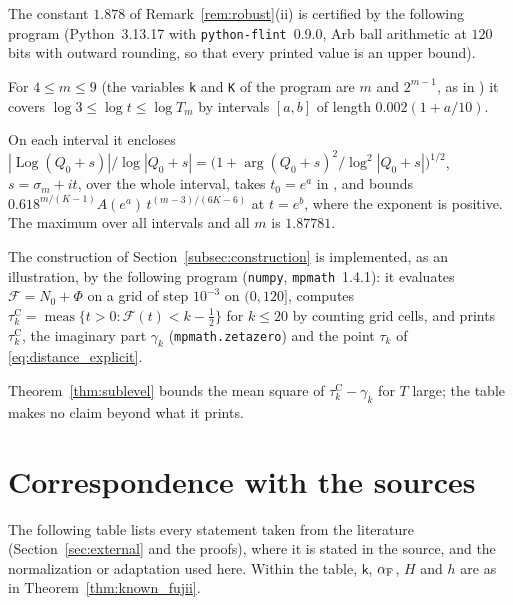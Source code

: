 \documentclass[11pt,a4paper]{article}
\makeatletter
\numberwithin{equation}{section}
\DeclareRobustCommand{\CGref}[1]{\ref{#1}}
\DeclareRobustCommand{\CGeqref}[1]{\eqref{#1}}
\DeclareRobustCommand{\CGcite}[2][]{\if\relax\detokenize{#1}\relax\cite{#2}\else\cite[#1]{#2}\fi}
\let\CG@origref\ref
\let\CG@origeqref\eqref
\newcommand{\CG@gettip}[1]{\@ifundefined{CGTip@#1}{#1}{\csname CGTip@#1\endcsname}}
\newcommand{\CG@getbib}[1]{\@ifundefined{CGBib@#1}{#1}{\csname CGBib@#1\endcsname}}
\DeclareRobustCommand{\CGref}[1]{\pdftooltip{\CG@origref{#1}}{\CG@gettip{#1}}}
\DeclareRobustCommand{\CGeqref}[1]{\pdftooltip{\CG@origeqref{#1}}{\CG@gettip{#1}}}
\DeclareRobustCommand{\CGcite}[2][]{\pdftooltip{\if\relax\detokenize{#1}\relax\cite{#2}\else\cite[#1]{#2}\fi}{\CG@getbib{#2}}}
\theoremstyle{definition}
\theoremstyle{remark}
\newcommand{\Nz}{N_0} %
\newcommand{\Fc}{\mathcal F}
\newcommand{\Ph}{\Phi}
\newcommand{\meas}{\operatorname{meas}}
\makeatother
\begin{document}




The constant $1.878$ of Remark~\CGref{rem:robust}(ii) is certified by the following program (Python~3.13.17 with \texttt{python-flint}~0.9.0, Arb ball arithmetic at $120$ bits with outward rounding, so that every printed value is an upper bound).

For $4\le m\le9$ (the variables \texttt{k} and \texttt{K} of the program are $m$ and $2^{m-1}$, as in \CGcite[\S3]{Yang2024}) it covers $\log3\le\log t\le\log T_m$ by intervals $[a,b]$ of length $0.002(1+a/10)$.

On each interval it encloses $|\operatorname{Log}(Q_0+s)|/\log|Q_0+s|=\bigl(1+\arg(Q_0+s)^2/\log^2|Q_0+s|\bigr)^{1/2}$, $s=\sigma_m+it$, over the whole interval, takes $t_0=e^a$ in \CGcite[(3.12)]{Yang2024}, and bounds $0.618^{m/(K-1)}A(e^a)\,t^{(m-3)/(6K-6)}$ at $t=e^b$, where the exponent is positive. The maximum over all intervals and all $m$ is $1.87781$.





The construction of Section~\CGref{subsec:construction} is implemented, as an illustration, by the following program (\texttt{numpy}, \texttt{mpmath}~1.4.1): it evaluates $\Fc=\Nz+\Ph$ on a grid of step $10^{-3}$ on $(0,120]$, computes $\tau_{k}^{\mathrm C}=\meas\{t>0:\Fc(t)<k-\frac12\}$ for $k\le20$ by counting grid cells, and prints $\tau_{k}^{\mathrm C}$, the imaginary part $\gamma_k$ (\texttt{mpmath.zetazero}) and the point $\tau_k$ of \CGeqref{eq:distance_explicit}.

Theorem~\CGref{thm:sublevel} bounds the mean square of $\tau_{k}^{\mathrm C}-\gamma_k$ for $T$ large; the table makes no claim beyond what it prints.





\section{Correspondence with the sources}\label{app:sources}
The following table lists every statement taken from the literature (Section~\CGref{sec:external} and the proofs), where it is stated in the source, and the normalization or adaptation used here. Within the table, $\mathsf k$, $\alpha_{\rm F}$, $H$ and $h$ are as in Theorem~\CGref{thm:known_fujii}.
\end{document}
